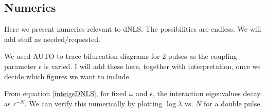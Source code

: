 \documentclass[12pt]{article}
\begin{document}
\subsection{Numerics}

Here we present numerics relevant to dNLS. The possibilities are endless. We will add stuff as needed/requested.

We used AUTO to trace bifurcation diagrams for 2-pulses as the coupling parameter $\epsilon$ is varied. I will add these here, together with interpretation, once we decide which figures we want to include.

From equation \eqref{inteigsDNLS}, for fixed $\omega$ and $\epsilon$, the interaction eigenvalues decay as $r^{-N}$. We can verify this numerically by plotting $\log \lambda$ vs. $N$ for a double pulse. 
\end{document}
